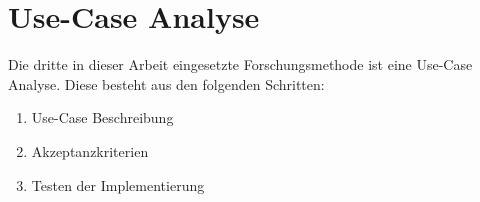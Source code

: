 \section{Use-Case Analyse}

Die dritte in dieser Arbeit eingesetzte Forschungsmethode ist eine Use-Case Analyse. Diese besteht aus den folgenden Schritten:
\begin{enumerate}
    \item Use-Case Beschreibung
    \item Akzeptanzkriterien
    \item Testen der Implementierung
\end{enumerate}